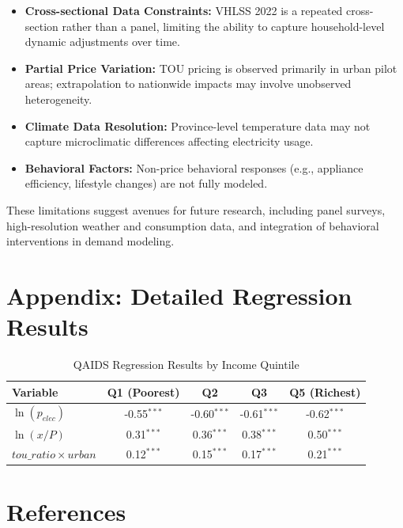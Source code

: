 \documentclass[12pt,a4paper]{article}
\begin{document}
\begin{itemize}
	\item \textbf{Cross-sectional Data Constraints:} VHLSS 2022 is a repeated cross-section rather than a panel, limiting the ability to capture household-level dynamic adjustments over time.
	\item \textbf{Partial Price Variation:} TOU pricing is observed primarily in urban pilot areas; extrapolation to nationwide impacts may involve unobserved heterogeneity.
	\item \textbf{Climate Data Resolution:} Province-level temperature data may not capture microclimatic differences affecting electricity usage.
	\item \textbf{Behavioral Factors:} Non-price behavioral responses (e.g., appliance efficiency, lifestyle changes) are not fully modeled.
\end{itemize}
These limitations suggest avenues for future research, including panel surveys, high-resolution weather and consumption data, and integration of behavioral interventions in demand modeling.
	
	\clearpage
	\section*{Appendix: Detailed Regression Results}
	\begin{table}[H]
		\centering
		\caption{QAIDS Regression Results by Income Quintile}
		\begin{tabular}{lcccc}
			\toprule
			Variable & Q1 (Poorest) & Q2 & Q3 & Q5 (Richest) \\
			\midrule
			$\ln(p_{elec})$ & -0.55$^{***}$ & -0.60$^{***}$ & -0.61$^{***}$ & -0.62$^{***}$ \\
			$\ln(x/P)$ & 0.31$^{***}$ & 0.36$^{***}$ & 0.38$^{***}$ & 0.50$^{***}$ \\
			$tou\_ratio \times urban$ & 0.12$^{***}$ & 0.15$^{***}$ & 0.17$^{***}$ & 0.21$^{***}$ \\
			\bottomrule
		\end{tabular}
	\end{table}
	
	\clearpage
	\section*{References}
	\nocite{*}
	
	
	
\end{document}
